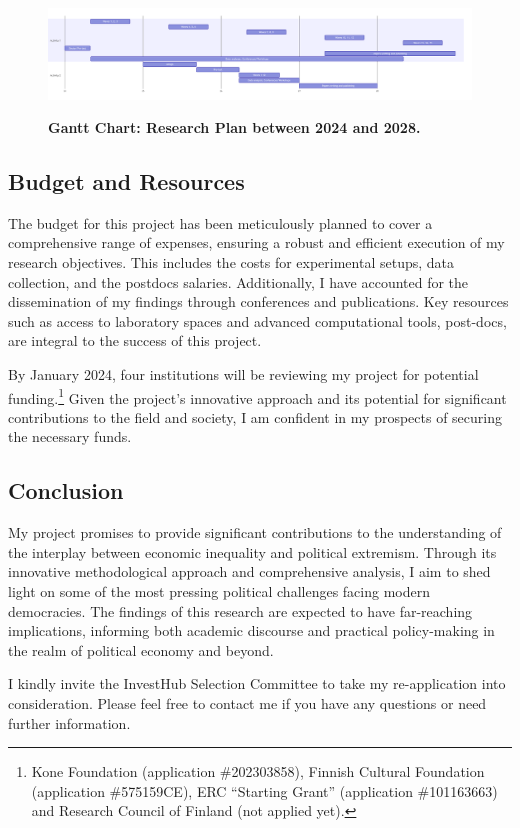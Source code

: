 \documentclass[letterpaper]{article}
\begin{document}
\begin{figure}[h]
\caption{{\bf Gantt Chart: Research Plan between 2024 and 2028.}}
\includegraphics[width=\textwidth]{gantt.png} 
\label{fig:1}
\end{figure}


\subsection*{Budget and Resources}

The budget for this project has been meticulously planned to cover a comprehensive range of expenses, ensuring a robust and efficient execution of my research objectives. This includes the costs for experimental setups, data collection, and the postdocs salaries. Additionally, I have accounted for the dissemination of my findings through conferences and publications. Key resources such as access to laboratory spaces and advanced computational tools, post-docs, are integral to the success of this project. 

\vspace{2mm}By January 2024, four institutions will be reviewing my project for potential funding.\footnote{Kone Foundation (application \#202303858), Finnish Cultural Foundation (application \#575159CE), ERC ``Starting Grant'' (application \#101163663) and Research Council of Finland (not applied yet).} Given the project's innovative approach and its potential for significant contributions to the field and society, I am confident in my prospects of securing the necessary funds.


\subsection*{Conclusion}

My project promises to provide significant contributions to the understanding of the interplay between economic inequality and political extremism. Through its innovative methodological approach and comprehensive analysis, I aim to shed light on some of the most pressing political challenges facing modern democracies. The findings of this research are expected to have far-reaching implications, informing both academic discourse and practical policy-making in the realm of political economy and beyond.

\vspace{2mm}I kindly invite the InvestHub Selection Committee to take my re-application into consideration. Please feel free to contact me if you have any questions or need further information.



\newpage
\printbibliography
\end{document}
